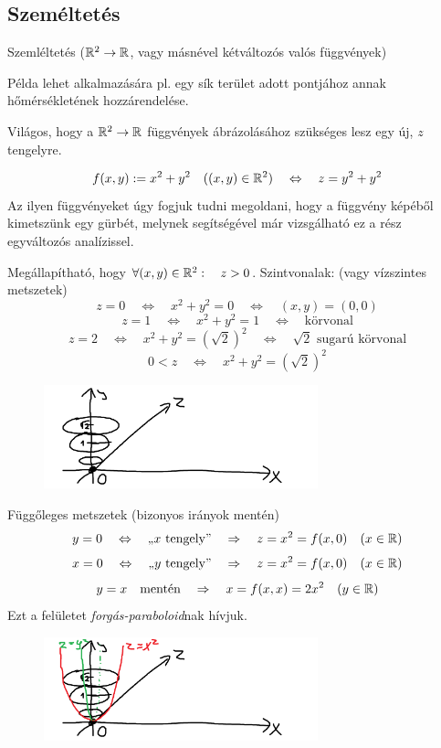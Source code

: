 \documentclass[a4paper,11.5pt]{article}
\begin{document}
	\subsection{Személtetés}
	\begin{example}
		Szemléltetés ($\mathbb{R}^2\to\mathbb{R}$, vagy másnével kétváltozós valós függvények)
	\end{example}
	\begin{note}
		Példa lehet alkalmazására pl. egy sík terület adott pontjához annak hőmérsékletének hozzárendelése.
	\end{note}
	\begin{note}
		Világos, hogy a $\mathbb{R}^2\to\mathbb{R}$ függvények ábrázolásához szükséges lesz egy új, $z$ tengelyre.
	\end{note}
	\begin{task}
		\[ f(x,y):=x^2+y^2\quad ((x,y)\in\mathbb{R}^2)\quad \Leftrightarrow\quad z=y^2+y^2 \]
		Az ilyen függvényeket úgy fogjuk tudni megoldani, hogy a függvény képéből kimetszünk egy gürbét, melynek segítségével már vizsgálható ez a rész egyváltozós analízissel.
		
		\medskip
		Megállapítható, hogy $\forall (x,y)\in\mathbb{R}^2:\quad z>0$.
		\smallskip
		Szintvonalak: (vagy vízszintes metszetek)
		\[ z=0\quad \Leftrightarrow\quad x^2+y^2=0\quad \Leftrightarrow\quad (x,y)=(0,0) \]
		\[ z=1\quad \Leftrightarrow\quad x^2+y^2=1\quad \Leftrightarrow\quad \text{körvonal} \]
		\[ z=2\quad \Leftrightarrow\quad x^2+y^2=(\sqrt{2})^2\quad \Leftrightarrow\quad \text{$\sqrt{2}$ sugarú körvonal} \]
		\[ 0<z\quad \Leftrightarrow\quad x^2+y^2=(\sqrt{2})^2 \]
		\begin{figure}[H]
			\centering
			\includegraphics[height=3cm]{kepek/01.png}
			\caption{}
		\end{figure}
		Függőleges metszetek (bizonyos irányok mentén)
		\[ y=0\quad \Leftrightarrow\quad \text{,,$x$ tengely''}\quad \Rightarrow\quad z=x^2=f(x,0)\quad (x\in\mathbb{R}) \]
		\[ x=0\quad \Leftrightarrow\quad \text{,,$y$ tengely''}\quad \Rightarrow\quad z=x^2=f(x,0)\quad (x\in\mathbb{R}) \]
		\[ y=x\quad \text{mentén}\quad \Rightarrow\quad x=f(x,x)=2x^2\quad (y\in\mathbb{R}) \]
		Ezt a felületet \textit{forgás-paraboloid}nak hívjuk.
		\begin{figure}[H]
			\centering
			\includegraphics[height=3cm]{kepek/02.png}
			\caption{}
		\end{figure}
	\end{task}
\end{document}

